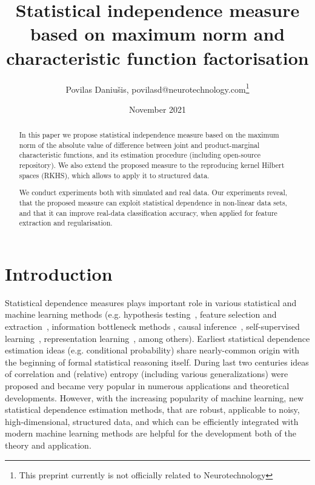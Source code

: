 \documentclass{article}
\title{Statistical independence measure based on maximum norm and characteristic function factorisation}
\author{Povilas Daniu\v{s}is, povilasd@neurotechnology.com\footnote{This preprint currently is not officially related to Neurotechnology}}
\date{November 2021}
\begin{document}
\maketitle

%

\begin{abstract}
    In this paper we propose statistical independence measure based on the maximum norm of the absolute value of difference between joint and product-marginal characteristic functions, and its estimation procedure (including open-source repository). We also extend the proposed measure to the reproducing kernel Hilbert spaces (RKHS), which allows to apply it to structured data.
    
    We conduct experiments both with simulated and real data. Our experiments reveal, that the proposed measure can exploit statistical dependence in non-linear data sets, and that it can improve real-data classification accuracy, when applied for feature extraction and regularisation.
    
\end{abstract}

\section{Introduction}
Statistical dependence measures plays important role in various statistical and machine learning methods (e.g. hypothesis testing~\cite{Gretton2005MeasuringSD}, feature selection and extraction~\cite{EigenHSIC,HSCA}, information bottleneck methods \cite{Ma2020TheHB}, causal inference~\cite{NIPS2008_f7664060}, self-supervised learning~\cite{li2021selfsupervised}, representation learning~\cite{Ragonesi2021LearningUR}, among others).  Earliest statistical dependence estimation ideas (e.g. conditional probability) share nearly-common origin with the beginning of formal statistical reasoning itself. During last two centuries ideas of correlation and (relative) entropy (including various generalizations) were proposed and became very popular in numerous applications and theoretical developments. However, with the increasing popularity of machine learning, new statistical dependence estimation methods, that are robust, applicable to noisy, high-dimensional, structured data, and which can be efficiently integrated with modern machine learning methods are helpful for the development both of the theory and application.
\end{document}
